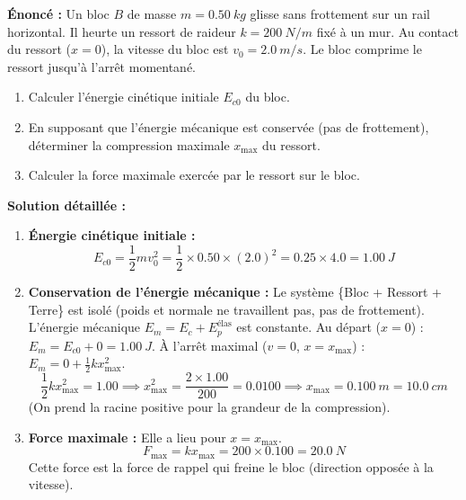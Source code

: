 \documentclass[11pt]{article}
\begin{document}
\begin{exoresolu}
\textbf{Énoncé :} Un bloc $B$ de masse $m = \SI{0,50}{kg}$ glisse sans frottement sur un rail horizontal. Il heurte un ressort de raideur $k = \SI{200}{N/m}$ fixé à un mur. Au contact du ressort ($x=0$), la vitesse du bloc est $v_0 = \SI{2,0}{m/s}$. Le bloc comprime le ressort jusqu'à l'arrêt momentané.
\begin{enumerate}
    \item Calculer l'énergie cinétique initiale $E_{c0}$ du bloc.
    \item En supposant que l'énergie mécanique est conservée (pas de frottement), déterminer la compression maximale $x_{\text{max}}$ du ressort.
    \item Calculer la force maximale exercée par le ressort sur le bloc.
\end{enumerate}
\textbf{Solution détaillée :}
\begin{enumerate}
    \item \textbf{Énergie cinétique initiale :}
    \[
    E_{c0} = \frac{1}{2} m v_0^2 = \frac{1}{2} \times \num{0,50} \times (\num{2,0})^2 = \num{0,25} \times \num{4,0} = \SI{1,00}{J}
    \]
    \item \textbf{Conservation de l'énergie mécanique :} Le système \{Bloc + Ressort + Terre\} est isolé (poids et normale ne travaillent pas, pas de frottement). L'énergie mécanique $E_m = E_c + E_p^{\text{élas}}$ est constante.
    Au départ ($x=0$) : $E_m = E_{c0} + 0 = \SI{1,00}{J}$.
    À l'arrêt maximal ($v=0$, $x=x_{\text{max}}$) : $E_m = 0 + \frac{1}{2} k x_{\text{max}}^2$.
    \[
    \frac{1}{2} k x_{\text{max}}^2 = \num{1,00} \implies x_{\text{max}}^2 = \frac{2 \times \num{1,00}}{\num{200}} = \num{0,0100} \implies x_{\text{max}} = \SI{0,100}{m} = \SI{10,0}{cm}
    \]
    (On prend la racine positive pour la grandeur de la compression).
    \item \textbf{Force maximale :} Elle a lieu pour $x = x_{\text{max}}$.
    \[
    F_{\text{max}} = k x_{\text{max}} = \num{200} \times \num{0,100} = \SI{20,0}{N}
    \]
    Cette force est la force de rappel qui freine le bloc (direction opposée à la vitesse).
\end{enumerate}
\end{exoresolu}
\end{document}
